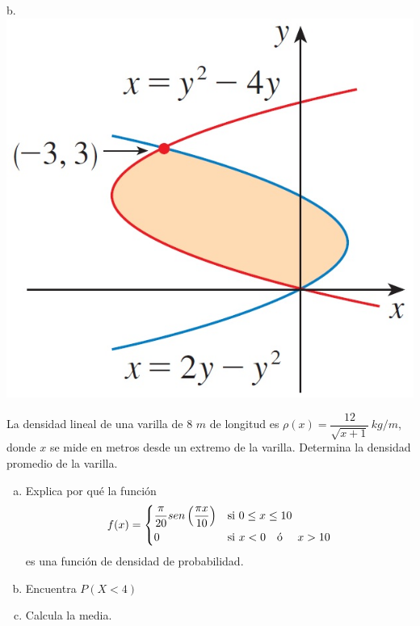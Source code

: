 \documentclass[9pt]{exam}
\begin{document}
\begin{questions}
\begin{multicols}{2}
    b. \includegraphics[scale=.3]{T-E3_2.jpg}
    \end{multicols}

\question La densidad lineal de una varilla de 8 $m$ de longitud es $\rho(x)=\dfrac{12}{\sqrt{x+1}} \, kg/m$, donde $x$ se mide en metros desde un extremo de la varilla. Determina la densidad promedio de la varilla. 

\vskip12pt
\vskip10pt
\question 
\begin{enumerate}[a)]
    \item Explica por qué la función $$ f(x) = \begin{dcases} \dfrac{\pi}{20}sen \left(\dfrac{\pi x}{10}\right) & \text{si } 0 \leq x \leq 10 \\ 0 & \text{si } x < 0 \quad \text{ó }\quad  x > 10 \end{dcases}$$
    es una función de densidad de probabilidad.

    \item Encuentra $P(X<4)$
    \item Calcula la media. 
\end{enumerate}


\end{questions}
\end{document}
